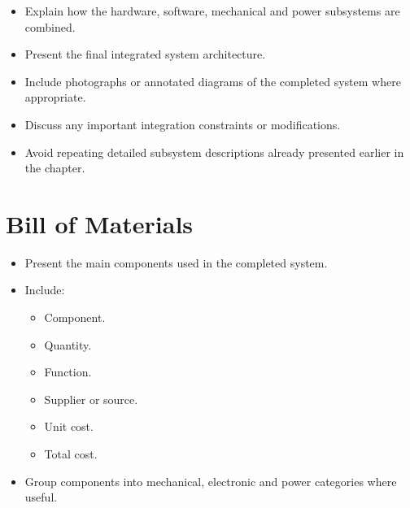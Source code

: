 \begin{itemize}
    \item Explain how the hardware, software, mechanical and power subsystems are combined.
    \item Present the final integrated system architecture.
    \item Include photographs or annotated diagrams of the completed system where appropriate.
    \item Discuss any important integration constraints or modifications.
    \item Avoid repeating detailed subsystem descriptions already presented earlier in the chapter.
\end{itemize}


\section{Bill of Materials}
\label{sec:BillOfMaterials}

\begin{itemize}
    \item Present the main components used in the completed system.
    \item Include:
    \begin{itemize}
        \item Component.
        \item Quantity.
        \item Function.
        \item Supplier or source.
        \item Unit cost.
        \item Total cost.
    \end{itemize}
    \item Group components into mechanical, electronic and power categories where useful.
\end{itemize}

%


